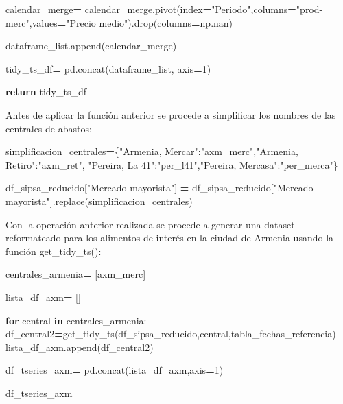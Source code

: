 \documentclass[
]{book}
\newenvironment{Shaded}{\begin{snugshade}}{\end{snugshade}}
\newcommand{\ControlFlowTok}[1]{\textcolor[rgb]{0.13,0.29,0.53}{\textbf{#1}}}
\newcommand{\DecValTok}[1]{\textcolor[rgb]{0.00,0.00,0.81}{#1}}
\newcommand{\KeywordTok}[1]{\textcolor[rgb]{0.13,0.29,0.53}{\textbf{#1}}}
\newcommand{\NormalTok}[1]{#1}
\newcommand{\OperatorTok}[1]{\textcolor[rgb]{0.81,0.36,0.00}{\textbf{#1}}}
\newcommand{\StringTok}[1]{\textcolor[rgb]{0.31,0.60,0.02}{#1}}
\begin{document}
\begin{Shaded}
\begin{Highlighting}[]
         
\NormalTok{         calendar\_merge}\OperatorTok{=}\NormalTok{ calendar\_merge.pivot(index}\OperatorTok{=}\StringTok{"Periodo"}\NormalTok{,columns}\OperatorTok{=}\StringTok{"prod{-}merc"}\NormalTok{,values}\OperatorTok{=}\StringTok{"Precio medio"}\NormalTok{).drop(columns}\OperatorTok{=}\NormalTok{np.nan)}
            
\NormalTok{         dataframe\_list.append(calendar\_merge)  }
        
        
\NormalTok{    tidy\_ts\_df}\OperatorTok{=}\NormalTok{ pd.concat(dataframe\_list, axis}\OperatorTok{=}\DecValTok{1}\NormalTok{)}
    
    
    
    \ControlFlowTok{return}\NormalTok{ tidy\_ts\_df}
\end{Highlighting}
\end{Shaded}

Antes de aplicar la función anterior se procede a simplificar los nombres de las centrales de abastos:

\begin{Shaded}
\begin{Highlighting}[]

\NormalTok{simplificacion\_centrales}\OperatorTok{=}\NormalTok{\{}\StringTok{"Armenia, Mercar"}\NormalTok{:}\StringTok{"axm\_merc"}\NormalTok{,}\StringTok{"Armenia, Retiro"}\NormalTok{:}\StringTok{"axm\_ret"}\NormalTok{,}
\StringTok{"Pereira, La 41"}\NormalTok{:}\StringTok{"per\_l41"}\NormalTok{,}\StringTok{"Pereira, Mercasa"}\NormalTok{:}\StringTok{"per\_merca"}\NormalTok{\}}

\NormalTok{df\_sipsa\_reducido[}\StringTok{"Mercado mayorista"}\NormalTok{] }\OperatorTok{=}\NormalTok{ df\_sipsa\_reducido[}\StringTok{"Mercado mayorista"}\NormalTok{].replace(simplificacion\_centrales)}
\end{Highlighting}
\end{Shaded}

Con la operación anterior realizada se procede a generar una dataset reformateado para los alimentos de interés en la ciudad de Armenia usando la función get\_tidy\_ts():

\begin{Shaded}
\begin{Highlighting}[]

\NormalTok{centrales\_armenia}\OperatorTok{=}\NormalTok{  [}\StringTok{\textquotesingle{}axm\_merc\textquotesingle{}}\NormalTok{]}

\NormalTok{lista\_df\_axm}\OperatorTok{=}\NormalTok{ []}

\ControlFlowTok{for}\NormalTok{ central }\KeywordTok{in}\NormalTok{ centrales\_armenia:}
\NormalTok{    df\_central2}\OperatorTok{=}\NormalTok{get\_tidy\_ts(df\_sipsa\_reducido,central,tabla\_fechas\_referencia)}
\NormalTok{    lista\_df\_axm.append(df\_central2)}

\NormalTok{df\_tseries\_axm}\OperatorTok{=}\NormalTok{ pd.concat(lista\_df\_axm,axis}\OperatorTok{=}\DecValTok{1}\NormalTok{)}

\NormalTok{df\_tseries\_axm}
\end{Highlighting}
\end{Shaded}
\end{document}
